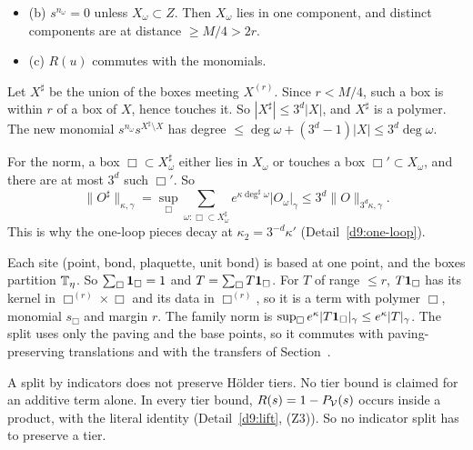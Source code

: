\begin{detail}
\begin{itemize}
\begin{itemize}
\item (b) $s^{n_\omega}=0$ unless $X_\omega\subset Z$. Then $X_\omega$ lies in one component, and distinct components are at distance $\ge M/4>2r$.
\item (c) $R(u)$ commutes with the monomials.
\end{itemize}
\end{itemize}
\end{detail}

\begin{detail}\label{d9:fam-def}
\begin{step}
Let $X^\sharp$ be the union of the boxes meeting $X^{(r)}$. Since $r<M/4$, such a box is within $r$ of a box of $X$, hence touches it. So $|X^\sharp|\le3^d|X|$, and $X^\sharp$ is a polymer. The new monomial $s^{n_\omega}s^{X^\sharp\setminus X}$ has degree $\le\deg\omega+(3^d-1)|X|\le3^d\deg\omega$.

For the norm, a box $\Box\subset X^\sharp_\omega$ either lies in $X_\omega$ or touches a box $\Box'\subset X_\omega$, and there are at most $3^d$ such $\Box'$. So
\[
\|O^\sharp\|_{\kappa,\gamma}=\sup_\Box\sum_{\omega:\Box\subset X^\sharp_\omega}e^{\kappa\deg^\sharp\omega}|O_\omega|_\gamma\le3^d\|O\|_{3^d\kappa,\gamma} .
\]
This is why the one-loop pieces decay at $\kappa_2=3^{-d}\kappa'$ (Detail~\ref{d9:one-loop}).
\end{step}
\begin{step}
Each site (point, bond, plaquette, unit bond) is based at one point, and the boxes partition $\mathbb T_\eta$. So $\sum_\Box\mathbf 1_\Box=1$ and $T=\sum_\Box T\mathbf 1_\Box$. For $T$ of range $\le r$, $T\mathbf 1_\Box$ has its kernel in $\Box^{(r)}\times\Box$ and its data in $\Box^{(r)}$, so it is a term with polymer $\Box$, monomial $s_\Box$ and margin $r$. The family norm is $\sup_\Box e^\kappa|T\mathbf 1_\Box|_\gamma\le e^\kappa|T|_\gamma$. The split uses only the paving and the base points, so it commutes with paving-preserving translations and with the transfers of Section~.

A split by indicators does not preserve H\"older tiers. No tier bound is claimed for an additive term alone. In every tier bound, $R(s)=1-P_\mathcal V(s)$ occurs inside a product, with the literal identity (Detail~\ref{d9:lift}, (Z3)). So no indicator split has to preserve a tier.
\end{step}
\end{detail}

